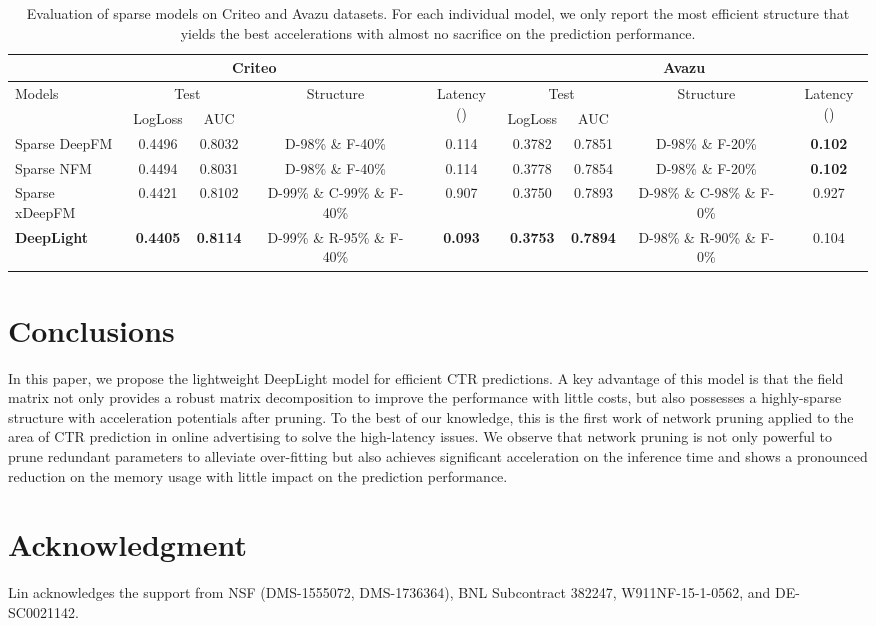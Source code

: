 \documentclass[sigconf]{acmart}
\begin{document}
\begin{table*}
 \caption{Evaluation of sparse models on Criteo and Avazu datasets. For each individual model, we only report the most efficient structure that yields the best accelerations with almost no sacrifice on the prediction performance. }
  \centering
  \small
  \begin{tabular}{lcccc|cccc}
    \toprule
    \multicolumn{5}{c|}{Criteo} & \multicolumn{4}{c}{Avazu} \\  
    \midrule
    \multirow{2}{*}{Models}    & \multicolumn{2}{c}{Test} & \multirow{2}{*}{Structure}  & \multirow{2}{*}{Latency ()} & \multicolumn{2}{c}{Test} & \multirow{2}{*}{Structure} & \multirow{2}{*}{Latency ()}  \\
      & LogLoss   & AUC &  & & LogLoss & AUC & \\
    \midrule
    Sparse DeepFM    & 0.4496 & 0.8032 &  D-98\% \& F-40\% & 0.114 & 0.3782  & 0.7851 & D-98\% \& F-20\% & \textbf{0.102}  \\
    Sparse NFM        &   0.4494 & 0.8031  & D-98\% \& F-40\% & 0.114  & 0.3778  & 0.7854 & D-98\% \& F-20\%  & \textbf{0.102}    \\
    Sparse xDeepFM     & 0.4421 & 0.8102 & \small{D-99\% \& C-99\% \& F-40\%}  &  0.907 & 0.3750  & 0.7893  &  \small{D-98\% \& C-98\% \& F-0\%} & 0.927   \\
    \midrule
    \textbf{DeepLight}    & \textbf{0.4405} & \textbf{0.8114}  & \small{D-99\% \& R-95\% \& F-40\%}  &  \textbf{0.093} & \textbf{0.3753} & \textbf{0.7894}  & \small{D-98\% \& R-90\% \& F-0\%} & 0.104  \\
    \bottomrule
  \end{tabular}
  \vspace{-0.5em}
  \label{sparse_criteo_data}
\end{table*}

\section{Conclusions}

In this paper, we propose the lightweight DeepLight model for efficient CTR predictions. A key advantage of this model is that the field matrix  not only provides a robust matrix decomposition to improve the performance with little costs, but also possesses a highly-sparse structure with acceleration potentials after pruning. To the best of our knowledge, this is the first work of network pruning applied to the area of CTR prediction in online advertising to solve the high-latency issues. We observe that network pruning is not only powerful to prune redundant parameters to alleviate over-fitting but also achieves significant acceleration on the inference time and shows a pronounced reduction on the memory usage with little impact on the prediction performance. 

\section*{Acknowledgment} 
Lin acknowledges the support from NSF (DMS-1555072, DMS-1736364), BNL Subcontract 382247, W911NF-15-1-0562, and DE-SC0021142.



\end{document}
